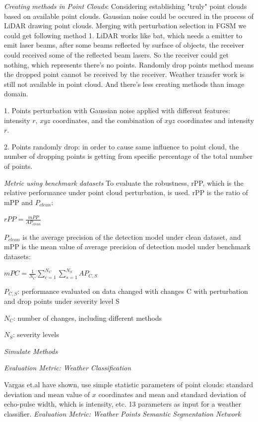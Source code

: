 \textit{Creating methods in Point Clouds}: Considering establishing "truly" point clouds based on available point clouds. Gaussian noise could be occured in the process of LiDAR drawing point clouds\cite{gatt_micro-doppler_2000}. Merging with perturbation selection in FGSM we could get following method 1. LiDAR works like bat, which needs a emitter to emit laser beams, after some beams reflected by surface of objects, the receiver could received some of the reflected beam lasers. So the receiver could get nothing, which represents there's no points. Randomly drop points method means the dropped point cannot be received by the receiver. Weather transfer work is still not available in point cloud. And there's less creating methods than image domain.

1. Points perturbation with Gaussian noise applied with different features: intensity \(r\), \(xyz\) coordinates, and the combination of \(xyz\) coordinates and intensity \(r\).

2. Points randomly drop: in order to cause same influence to point cloud, the number of dropping points is getting from specific percentage of the total number of points.

\textit{Metric using benchmark datasets}
 To evaluate the robustness, rPP, which is the relative performance under point cloud perturbation, is used. rPP is the ratio of mPP and \(P_{clean}\):
\begin{center}
          \(rPP = \frac{mPP}{AP_{clean}} \)
\end{center}
\(P_{clean}\) is the average precision of the detection model under clean dataset, and mPP is the mean value of average precision of detection model under benchmark datasets:
\begin{center}
          \(mPC = \frac{1}{N_{C}}\sum_{c=1}^{N_{C}}\sum_{s=1}^{N_{S}}{AP_{C,S}} \)
\end{center}
\({P_{C,S}}\): performance evaluated on data changed with changes C with perturbation and drop points under severity level S

\({N_{C}}\): number of changes, including different methods

\({N_{S}}\): severity levels



\textit{Simulate Methods}

 
  \textit{Evaluation Metric: Weather Classification} 
 
 Vargas et.al\cite{vargas_rivero_weather_2020} have shown, use simple statistic parameters of point clouds: standard deviation and mean value of \(x\) coordinates and mean and standard deviation of echo-pulse width, which is intensity, etc. 13 parameters as input for a weather classifier.
 \textit{Evaluation Metric: Weather Points Semantic Segmentation Network}
 

